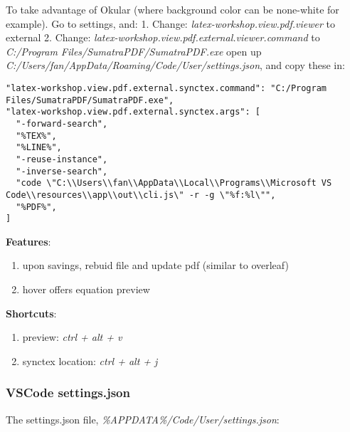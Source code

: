 \documentclass[]{article}
\providecommand{\tightlist}{%
  \setlength{\itemsep}{0pt}\setlength{\parskip}{0pt}}
\begin{document}
To take advantage of Okular (where background color can be none-white
for example). Go to settings, and: 1. Change:
\emph{latex-workshop.view.pdf.viewer} to external 2. Change:
\emph{latex-workshop.view.pdf.external.viewer.command} to
\emph{C:/Program Files/SumatraPDF/SumatraPDF.exe} open up
\emph{C:/Users/fan/AppData/Roaming/Code/User/settings.json}, and copy
these in:

\begin{verbatim}
"latex-workshop.view.pdf.external.synctex.command": "C:/Program Files/SumatraPDF/SumatraPDF.exe",
"latex-workshop.view.pdf.external.synctex.args": [
  "-forward-search",
  "%TEX%",
  "%LINE%",
  "-reuse-instance",
  "-inverse-search",
  "code \"C:\\Users\\fan\\AppData\\Local\\Programs\\Microsoft VS Code\\resources\\app\\out\\cli.js\" -r -g \"%f:%l\"",
  "%PDF%",
]
\end{verbatim}

\textbf{Features}:

\begin{enumerate}
\def\labelenumi{\arabic{enumi}.}
\tightlist
\item
  upon savings, rebuid file and update pdf (similar to overleaf)
\item
  hover offers equation preview
\end{enumerate}

\textbf{Shortcuts}:

\begin{enumerate}
\def\labelenumi{\arabic{enumi}.}
\tightlist
\item
  preview: \emph{ctrl + alt + v}
\item
  synctex location: \emph{ctrl + alt + j}
\end{enumerate}

\hypertarget{vscode-settings.json}{%
\subsubsection{VSCode settings.json}\label{vscode-settings.json}}

The settings.json file, \emph{\%APPDATA\%/Code/User/settings.json}:
\end{document}

